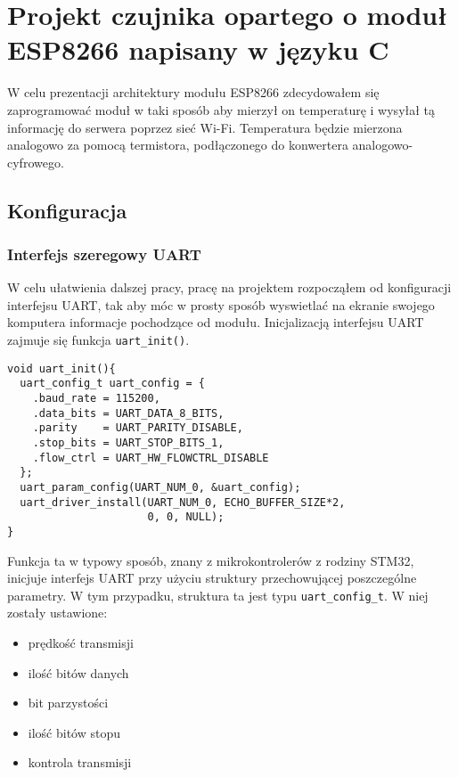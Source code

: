\chapter{Projekt czujnika opartego o moduł ESP8266 napisany w języku C}
\label{projekt}

W celu prezentacji architektury modułu ESP8266 zdecydowałem się zaprogramować 
moduł w taki sposób aby mierzył on temperaturę i wysyłał tą informację do serwera
poprzez sieć Wi-Fi. Temperatura będzie mierzona analogowo za pomocą termistora, 
podłączonego do konwertera analogowo-cyfrowego.

\section{Konfiguracja}
\label{projekt_konfiguracja}

\subsection{Interfejs szeregowy UART}
\label{projekt_uart}
W celu ułatwienia dalszej pracy, pracę na projektem rozpocząłem od konfiguracji
interfejsu UART, tak aby móc w prosty sposób wyswietlać na ekranie swojego komputera
informacje pochodzące od modułu. Inicjalizacją interfejsu UART zajmuje się funkcja
\verb+uart_init()+. \\

\begin{lstlisting}[style=customc,
    frame=single,
    caption={Konfiguracja interfejsu UART},
    captionpos=b,
    label={esptool_basic}]
void uart_init(){
  uart_config_t uart_config = {
    .baud_rate = 115200,
    .data_bits = UART_DATA_8_BITS,
    .parity    = UART_PARITY_DISABLE,
    .stop_bits = UART_STOP_BITS_1,
    .flow_ctrl = UART_HW_FLOWCTRL_DISABLE
  };
  uart_param_config(UART_NUM_0, &uart_config);
  uart_driver_install(UART_NUM_0, ECHO_BUFFER_SIZE*2, 
                      0, 0, NULL);
}
\end{lstlisting}

Funkcja ta w typowy sposób, znany z mikrokontrolerów z rodziny STM32, inicjuje interfejs UART
przy użyciu struktury przechowującej poszczególne parametry. W tym przypadku, struktura ta 
jest typu \verb+uart_config_t+. W niej zostały ustawione:\\
\begin{itemize}
    \item prędkość transmisji 
    \item ilość bitów danych
    \item bit parzystości
    \item ilość bitów stopu
    \item kontrola transmisji\\
\end{itemize} 

